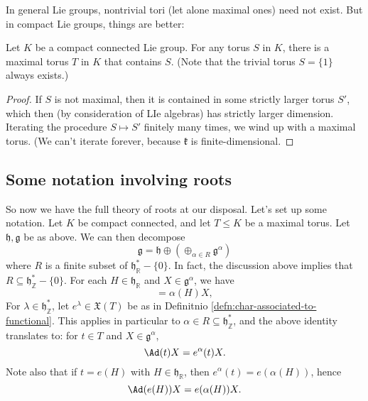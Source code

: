 \documentclass[reqno]{amsart} 
\begin{document}
In general Lie groups, nontrivial tori (let alone maximal ones) need not exist.  But in compact Lie groups, things are better:
\begin{lemma}
  Let $K$ be a compact connected Lie group.  For any torus $S$ in $K$, there is a maximal torus $T$ in $K$ that contains $S$.  (Note that the trivial torus $S = \{1\}$ always exists.)
\end{lemma}
\begin{proof}
  If $S$ is not maximal, then it is contained in some strictly larger torus $S'$, which then (by consideration of LIe algebras) has strictly larger dimension.  Iterating the procedure $S \mapsto S'$ finitely many times, we wind up with a maximal torus.  (We can't iterate forever, because $\mathfrak{k}$ is finite-dimensional.
\end{proof}

\subsection{Some notation involving roots\label{sec:notationinvolvingroots-for-amxl-tori-section}}
\label{sec:org822bc0f}
So now we have the full theory of roots at our disposal.  Let's set up some notation.  Let $K$ be compact connected, and let $T \leq K$ be a maximal torus.  Let $\mathfrak{h},\mathfrak{g}$ be as above.  We can then decompose
\begin{equation}\label{eq:root-space-decmop-for-compact-LIe-group-amxiaml-trous}
  \mathfrak{g} = \mathfrak{h} \oplus (\oplus_{\alpha \in R} \mathfrak{g}^\alpha)
\end{equation}
where $R$ is a finite subset of $\mathfrak{h}_\mathbb{R}^* - \{0\}$.  In fact, the discussion above implies that $R \subseteq \mathfrak{h}_\mathbb{Z}^* - \{0\}$.  For each $H \in \mathfrak{h}_\mathbb{R}$ and $X \in \mathfrak{g}^\alpha$, we have
\begin{equation*}
 [H,X] = \alpha(H) X,
\end{equation*}
For $\lambda \in \mathfrak{h}_\mathbb{Z}^*$, let $e^\lambda \in \mathfrak{X}(T)$ be as in Definitnio \ref{defn:char-associated-to-functional}.  This applies in particular to $\alpha \in R \subseteq \mathfrak{h}_\mathbb{Z}^*$, and the above identity translates to: for $t \in T$ and $X \in \mathfrak{g}^\alpha$,
\begin{equation*}
  \Ad(t) X = e^\alpha (t) X.
\end{equation*}
Note also that if $t = e(H)$ with $H \in \mathfrak{h}_\mathbb{R}$, then $e^\alpha (t) = e(\alpha(H))$, hence
\begin{equation}\label{eq:how-ad-e-H-acts-on-X}
  \Ad(e(H)) X = e(\alpha(H)) X.
\end{equation}
\end{document}
